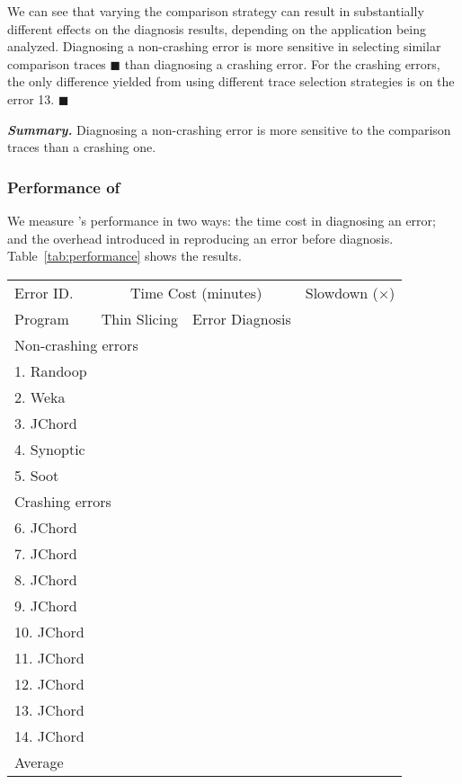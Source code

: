 We can see that varying the comparison strategy can result in
substantially different effects on the diagnosis results,
depending on the application being analyzed. Diagnosing
a non-crashing error is more sensitive in selecting similar
comparison traces $\blacksquare$ than diagnosing
a crashing error.
For the \crash crashing errors, the only difference yielded
from using different trace selection strategies is on
the error 13. $\blacksquare$


\vspace{1mm}
\noindent \textbf{\textit{Summary.}} Diagnosing a non-crashing
error is more sensitive to the comparison traces than a crashing one.

\subsubsection{Performance of \ourtool}

We measure \ourtool's performance in two ways: the time cost
in diagnosing an error; and the overhead introduced
in reproducing an error before diagnosis.  Table~\ref{tab:performance}
shows the results.

\begin{table}[t]
\setlength{\tabcolsep}{.44\tabcolsep}
\begin{tabular}{|l|c|c|c|}
\hline
 Error ID. & \multicolumn{2}{|c|}{Time Cost (minutes)} & Slowdown ($\times$)\\
\cline{2-3}
 Program & Thin Slicing & Error Diagnosis &  \\
 \hline
\hline
\multicolumn{4}{|l|}{Non-crashing errors}   \\
 \hline
 1. Randoop &  &  & \\
 2. Weka &  &  & \\
 3. JChord &  &  & \\
 4. Synoptic &  &  & \\
 5. Soot &  &  & \\
\hline
\hline
\multicolumn{4}{|l|}{Crashing errors}   \\
\hline
 6. JChord &  &  &\\
 7. JChord &  &  &\\
 8. JChord &  &  &\\
 9. JChord &  &  &\\
 10. JChord &  &  &\\
 11. JChord &  &  &\\
 12. JChord &  &  &\\
 13. JChord &  &  &\\
 14. JChord &  &  &\\
\hline
\hline
Average & & &\\
\hline
\end{tabular}

\end{table}

